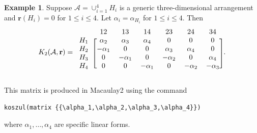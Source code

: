 \documentclass[11pt, reqno]{amsart}
\newcommand{\br}{\mathbf{r}}
\newcommand{\A}{\mathcal{A}}
\theoremstyle{definition}
\newtheorem{example}[theorem]{Example}
\theoremstyle{remark}
\numberwithin{equation}{section}
\begin{document}
\begin{example}
Suppose $\A=\cup_{i=1}^4 H_i$ is a generic three-dimensional arrangement and $\br(H_i)=0$ for $1\le i\le 4$.  Let $\alpha_i=\alpha_{H_i}$ for $1\le i\le 4$.  Then
\begin{equation*}
	K_2(\A,\br)=
	\begin{blockarray}{ccccccc}
		& 12 & 13 & 14& 23 & 24 & 34 \\
		\begin{block}{c[cccccc]}
			H_1 & \alpha_2 & \alpha_3 & \alpha_4 & 0 & 0 & 0 \\ 
			H_2 & -\alpha_1 & 0 & 0 & \alpha_3 & \alpha_4 & 0 \\
			H_3 & 0 & -\alpha_1 & 0 & -\alpha_2 & 0 & \alpha_4 \\
			H_4 & 0 & 0 & -\alpha_1 & 0 & -\alpha_2 & -\alpha_3  \\
		\end{block}
	\end{blockarray}.
\end{equation*}

This matrix is produced in Macaulay2 using the command
\begin{verbatim}
koszul(matrix {{\alpha_1,\alpha_2,\alpha_3,\alpha_4}})
\end{verbatim}
where $\alpha_1,\ldots,\alpha_4$ are specific linear forms.

\end{example}



\end{document}
